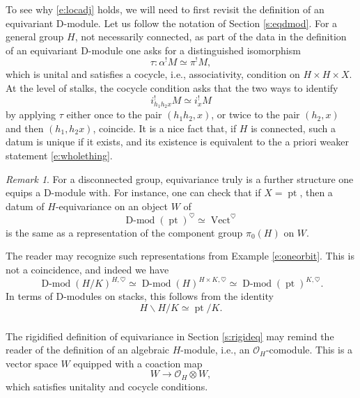 \documentclass[10pt]{amsart}
\newcommand{\on}{\operatorname}
\newcommand{\Dmod}{\on{D-mod}}
\newcommand{\Vect}{\on{Vect}}
\theoremstyle{remark}
\newtheorem{re}[subsubsection]{Remark}
\numberwithin{equation}{section}
\newcommand{\sO}{\mathscr{O}}
\begin{document}
	 
	\subsubsection{}
	To see why \eqref{e:locadj} holds, we will need to first revisit 
	the definition of an equivariant 
	D-module. Let us follow the notation of Section \ref{s:eqdmod}. For a 
	general group $H$, not necessarily connected, as part of the data in 
	the 
	definition of an equivariant D-module one asks 
	for a distinguished isomorphism 
	\[
	\tau:  \alpha^! M \simeq \pi^! M,
	\]
	which is unital and satisfies a cocycle, i.e., associativity, condition on 
	$H 
	\times H \times 
	X$. At the 
	level of stalks, the cocycle condition asks that the two ways to identify
	\[
	i^!_{h_1 h_2 x} M \simeq i_x^! M
	\]
	by applying $\tau$ either once to the pair $(h_1h_2, x)$, or twice to the 
	pair 
	$(h_2, x)$ and then 
	$(h_1, h_2x)$, coincide. It is a nice fact that, if $H$ is connected, such a 
	datum is unique if it exists, and its existence is equivalent to the a 
	priori 
	weaker statement \eqref{e:wholething}.


		\begin{re}
	For a disconnected group, equivariance truly is a further structure one 
	equips 
	a 
	D-module with. For instance,  one can check that if $X = \on{pt}$, then a 
	datum of $H$-equivariance on an object $W$ of 
	\[
	\Dmod(\on{pt})^\heartsuit \simeq \Vect^\heartsuit 
	\]
	is the same as a representation of the component group $\pi_0(H)$ on $W$. 
	
 The reader may recognize such representations from Example 
	\ref{e:oneorbit}. This is not a coincidence, and indeed we have 
		\[ \Dmod(H/K)^{H, \heartsuit} \simeq \Dmod(H)^{H \times K, \heartsuit} 
		\simeq \Dmod(\on{pt})^{K, \heartsuit}.  \]
	In terms of D-modules on stacks, this follows from the identity $$H 
	\backslash H/K \simeq \on{pt}/K.$$	
		
	\end{re}
	
	
	\label{s:rigideq}
	
	\subsubsection{} \label{s:rigimon} The rigidified definition of equivariance in Section 
	\ref{s:rigideq} may remind the reader of the definition of an algebraic 
	$H$-module, i.e., an $\sO_H$-comodule. This is a vector space $W$ 
	equipped with a coaction map 
	\[
	   W \rightarrow \sO_H \otimes W,
	\]
	which satisfies unitality and cocycle conditions. 
	
\end{document}
